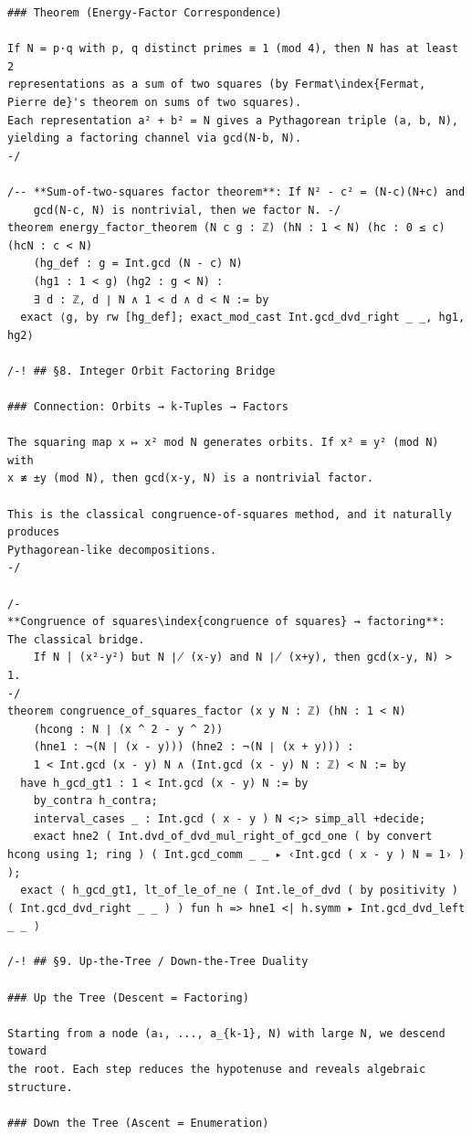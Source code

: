 \documentclass[11pt,openany]{book}
\theoremstyle{definition}
\theoremstyle{plain}
\theoremstyle{remark}
\begin{document}
\begin{lstlisting}[style=lean]
### Theorem (Energy-Factor Correspondence)

If N = p·q with p, q distinct primes ≡ 1 (mod 4), then N has at least 2
representations as a sum of two squares (by Fermat\index{Fermat, Pierre de}'s theorem on sums of two squares).
Each representation a² + b² = N gives a Pythagorean triple (a, b, N),
yielding a factoring channel via gcd(N-b, N).
-/

/-- **Sum-of-two-squares factor theorem**: If N² - c² = (N-c)(N+c) and
    gcd(N-c, N) is nontrivial, then we factor N. -/
theorem energy_factor_theorem (N c g : ℤ) (hN : 1 < N) (hc : 0 ≤ c) (hcN : c < N)
    (hg_def : g = Int.gcd (N - c) N)
    (hg1 : 1 < g) (hg2 : g < N) :
    ∃ d : ℤ, d ∣ N ∧ 1 < d ∧ d < N := by
  exact ⟨g, by rw [hg_def]; exact_mod_cast Int.gcd_dvd_right _ _, hg1, hg2⟩

/-! ## §8. Integer Orbit Factoring Bridge

### Connection: Orbits → k-Tuples → Factors

The squaring map x ↦ x² mod N generates orbits. If x² ≡ y² (mod N) with
x ≢ ±y (mod N), then gcd(x-y, N) is a nontrivial factor.

This is the classical congruence-of-squares method, and it naturally produces
Pythagorean-like decompositions.
-/

/-
**Congruence of squares\index{congruence of squares} → factoring**: The classical bridge.
    If N | (x²-y²) but N ∤ (x-y) and N ∤ (x+y), then gcd(x-y, N) > 1.
-/
theorem congruence_of_squares_factor (x y N : ℤ) (hN : 1 < N)
    (hcong : N ∣ (x ^ 2 - y ^ 2))
    (hne1 : ¬(N ∣ (x - y))) (hne2 : ¬(N ∣ (x + y))) :
    1 < Int.gcd (x - y) N ∧ (Int.gcd (x - y) N : ℤ) < N := by
  have h_gcd_gt1 : 1 < Int.gcd (x - y) N := by
    by_contra h_contra;
    interval_cases _ : Int.gcd ( x - y ) N <;> simp_all +decide;
    exact hne2 ( Int.dvd_of_dvd_mul_right_of_gcd_one ( by convert hcong using 1; ring ) ( Int.gcd_comm _ _ ▸ ‹Int.gcd ( x - y ) N = 1› ) );
  exact ⟨ h_gcd_gt1, lt_of_le_of_ne ( Int.le_of_dvd ( by positivity ) ( Int.gcd_dvd_right _ _ ) ) fun h => hne1 <| h.symm ▸ Int.gcd_dvd_left _ _ ⟩

/-! ## §9. Up-the-Tree / Down-the-Tree Duality

### Up the Tree (Descent = Factoring)

Starting from a node (a₁, ..., a_{k-1}, N) with large N, we descend toward
the root. Each step reduces the hypotenuse and reveals algebraic structure.

### Down the Tree (Ascent = Enumeration)


\end{lstlisting}
\end{document}
